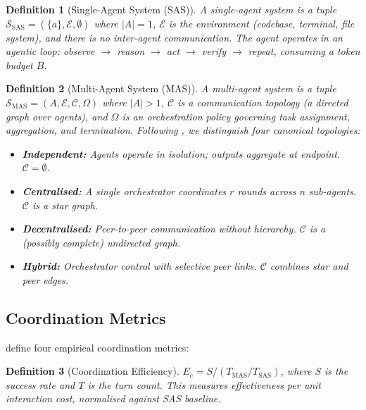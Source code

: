 \documentclass[11pt, a4paper, logo, copyright]{googledeepmind}
\newtheorem{definition}{Definition}[section]
\begin{document}
\begin{definition}[Single-Agent System (SAS)]
A \emph{single-agent system} is a tuple $\mathcal{S}_{\text{SAS}} = (\{a\}, \mathcal{E}, \emptyset)$ where $|A| = 1$, $\mathcal{E}$ is the environment (codebase, terminal, file system), and there is no inter-agent communication. The agent operates in an agentic loop: \emph{observe $\to$ reason $\to$ act $\to$ verify $\to$ repeat}, consuming a token budget $B$.
\end{definition}

\begin{definition}[Multi-Agent System (MAS)]
A \emph{multi-agent system} is a tuple $\mathcal{S}_{\text{MAS}} = (A, \mathcal{E}, \mathcal{C}, \Omega)$ where $|A| > 1$, $\mathcal{C}$ is a \emph{communication topology} (a directed graph over agents), and $\Omega$ is an \emph{orchestration policy} governing task assignment, aggregation, and termination. Following \citet{kim2025scaling}, we distinguish four canonical topologies:
\begin{itemize}
    \item \textbf{Independent:} Agents operate in isolation; outputs aggregate at endpoint. $\mathcal{C} = \emptyset$.
    \item \textbf{Centralised:} A single orchestrator coordinates $r$ rounds across $n$ sub-agents. $\mathcal{C}$ is a star graph.
    \item \textbf{Decentralised:} Peer-to-peer communication without hierarchy. $\mathcal{C}$ is a (possibly complete) undirected graph.
    \item \textbf{Hybrid:} Orchestrator control with selective peer links. $\mathcal{C}$ combines star and peer edges.
\end{itemize}
\end{definition}

\subsection{Coordination Metrics}

\citet{kim2025scaling} define four empirical coordination metrics:

\begin{definition}[Coordination Efficiency]
$E_c = S / (T_{\text{MAS}} / T_{\text{SAS}})$, where $S$ is the success rate and $T$ is the turn count. This measures effectiveness per unit interaction cost, normalised against SAS baseline.
\end{definition}
\end{document}

